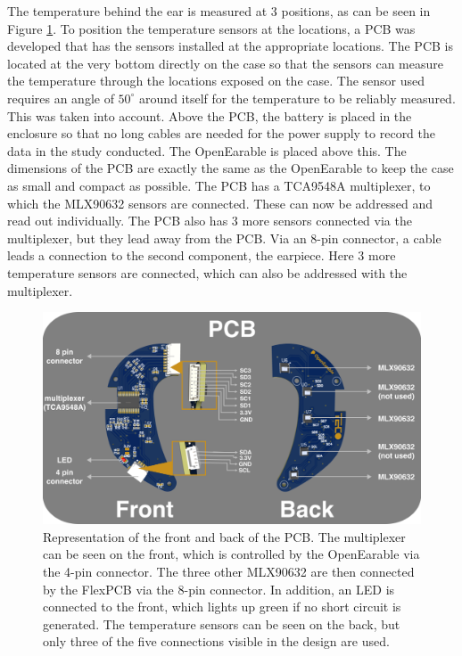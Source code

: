 The temperature behind the ear is measured at 3 positions, as can be seen in Figure \ref{fig:design:pcb_description}.
To position the temperature sensors at the locations, a PCB was developed that has the sensors installed at the appropriate locations. 
The PCB is located at the very bottom directly on the case so that the sensors can measure the temperature through the locations exposed on the case.
The sensor used requires an angle of $ 50 ^ \circ$ around itself for the temperature to be reliably measured. 
This was taken into account.
Above the PCB, the battery is placed in the enclosure so that no long cables are needed for the power supply to record the data in the study conducted.
The OpenEarable is placed above this.
The dimensions of the PCB are exactly the same as the OpenEarable to keep the case as small and compact as possible.
The PCB has a TCA9548A multiplexer, to which the MLX90632 sensors are connected.
These can now be addressed and read out individually.
The PCB also has 3 more sensors connected via the multiplexer, but they lead away from the PCB.
Via an 8-pin connector, a cable leads a connection to the second component, the earpiece.
Here 3 more temperature sensors are connected, which can also be addressed with the multiplexer.

\begin{figure}[t]
    \centering
    \includegraphics[width=\textwidth]{thesis-doc/images/prototype/PCB_Description.png}
    \caption{Representation of the front and back of the PCB. The multiplexer can be seen on the front, which is controlled by the OpenEarable via the 4-pin connector. The three other MLX90632 are then connected by the FlexPCB via the 8-pin connector. In addition, an LED is connected to the front, which lights up green if no short circuit is generated. The temperature sensors can be seen on the back, but only three of the five connections visible in the design are used.}
    \label{fig:design:pcb_description}
\end{figure}

